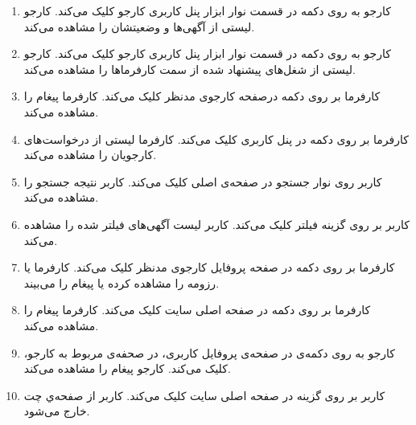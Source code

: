 \begin{enumerate}
	\item[] \label{uc:see-reqs}
	\tuc		
	{کارجو به روی دکمه‌  در قسمت نوار ابزار پنل کاربری کارجو کلیک می‌کند.}
	{کارجو لیستی از آگهی‌ها و وضعیتشان را مشاهده می‌کند.}
	
	\item[] 
	\tuc		
	{کارجو به روی دکمه‌  در قسمت نوار ابزار پنل کاربری کارجو کلیک می‌کند.}
	{کارجو لیستی از شغل‌های پیشنهاد شده از سمت کارفرماها را مشاهده می‌کند.}
		
	\item[] 
	\tuc				
	{کارفرما بر روی دکمه  درصفحه کارجوی مدنظر کلیک می‌کند.}
	{کارفرما پیغام  را مشاهده می‌کند.}
	
	\item[] \label{uc:req-manage}
	\tuc				
	{کارفرما بر روی دکمه  در پنل کاربری کلیک می‌کند.}
	{کارفرما لیستی از درخواست‌های کارجویان را مشاهده می‌کند.}
	
	\item[] \label{uc:apply-search}
	\tuc				
	{کاربر روی نوار جستجو در صفحه‌ی اصلی کلیک می‌کند.}
	{کاربر نتیجه جستجو را مشاهده می‌کند.}
	
	\item[] 
	\tuc				
	{کاربر بر روی گزینه فیلتر کلیک می‌کند.}
	{کاربر لیست آگهی‌های فیلتر شده را مشاهده می‌کند.}
	
	\item[] \label{uc:see-resumes}
	\tuc				
	{کارفرما بر روی دکمه  در صفحه پروفایل کارجوی مدنظر کلیک می‌کند.}
	{کارفرما یا رزومه را مشاهده کرده یا پیغام  را می‌بیند.}
	
	\item[] 
	\tuc				
	{کارفرما بر روی دکمه  در صفحه اصلی سایت کلیک می‌کند.}
	{کارفرما پیغام  را مشاهده می‌کند.}
	
	\item[] 
	\tuc				
	{کارجو به روی دکمه‌ی  در صفحه‌ی پروفایل کاربری، در صحفه‌ی مربوط به کارجو، کلیک می‌کند.}
	{کارجو پیغام  را مشاهده می‌کند.}
	
	\item[] 
	\tuc				
	{کاربر بر روی گزینه  در صفحه اصلی سایت کلیک می‌کند.}
	{کاربر از صفحه‌ي چت خارج می‌شود.}
	
	\renewcommand{\labelenumi}{\arabic{enumi})}
\end{enumerate}

